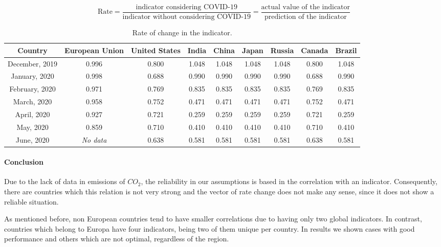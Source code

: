 \begin{equation}
	\text{Rate} = \frac{\text{indicator considering COVID-19}}{\text{indicator without considering COVID-19}} = \frac{\text{actual value of the indicator}}{\text{prediction of the indicator}} 
\end{equation}
\begin{table}[h!]
	\centering
	\begin{tabular}{c|cccccccc}
		\hline
		Country & European Union & United States & India & China & Japan & Russia & Canada & Brazil \\ 
		\hline 
		December, 2019 & 0.996 & 0.800 & 1.048 & 1.048 & 1.048 & 1.048 & 0.800 & 1.048  \\
		January, 2020 & 0.998 & 0.688 & 0.990 & 0.990 & 0.990 & 0.990 & 0.688 & 0.990 \\
		February, 2020 & 0.971 & 0.769 & 0.835 & 0.835 & 0.835 & 0.835 & 0.769 & 0.835 \\
		March, 2020 & 0.958 & 0.752 & 0.471 & 0.471 & 0.471 & 0.471 & 0.752 & 0.471 \\
		April, 2020 & 0.927 & 0.721 & 0.259 & 0.259 & 0.259 & 0.259 & 0.721 & 0.259 \\
		May, 2020 & 0.859 & 0.710 & 0.410 & 0.410 & 0.410 & 0.410 & 0.710 & 0.410 \\
		June, 2020 & \textit{No data} & 0.638 & 0.581 & 0.581 & 0.581 & 0.581 & 0.638 & 0.581 \\
		\hline
	\end{tabular}
	\vspace{1em}
	\caption{Rate of change in the indicator.}
	\label{table:change}  
\end{table}

\paragraph{Conclusion}
Due to the lack of data in emissions of $ CO_2 $, the reliability in our assumptions is based in the correlation with an indicator. Consequently, there are countries which this relation is not very strong and the vector of rate change does not make any sense, since it does not show a reliable situation. 

As mentioned before, non European countries tend to have smaller correlations due to having only two global indicators. In contrast, countries which belong to Europa have four indicators, being two of them unique per country. In results we shown cases with good performance and others which are not optimal, regardless of the region.